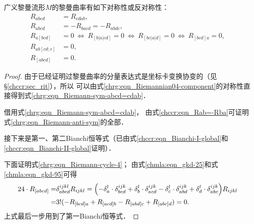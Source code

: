 \begin{theorem}\label{chrg:thm_Riemann-Sym-Properties}
广义黎曼流形$M$的黎曼曲率有如下对称性或反对称性：
\begin{align}
    R_{abcd} &= R_{cdab}, \label{chrg:eqn_Riemann-sym-abcd=cdab} \\
    R_{abcd} &= -R_{bacd} = -R_{abdc}, \label{chrg:eqn_Riemann-anti-sym}\\
    R_{a[bcd]} &= 0 \ \Leftrightarrow \ R_{[b|a|cd]} = 0
       \ \Leftrightarrow \ R_{[bc|a|d]} = 0 \ \Leftrightarrow \ R_{[bcd]a} = 0, \\
    R_{ab[cd;e]} &= 0, \\
    R_{[abcd]} &= 0 \label{chrg:eqn_Riemann-cycle-4}.
\end{align}
\end{theorem}
\begin{proof}
    由于已经证明过黎曼曲率的分量表达式是坐标卡变换协变的（见\S \ref{chccr:sec_rit}），所以
    可以由式\eqref{chrg:eqn_Riemannian04-component}的对称性直接得到式\eqref{chrg:eqn_Riemann-sym-abcd=cdab}．

    借用式\eqref{chrg:eqn_Riemann-sym-abcd=cdab}，
    由式\eqref{chccr:eqn_Rab=-Rba}可证明式\eqref{chrg:eqn_Riemann-anti-sym}的全部．

    接下来是第一、第二Bianchi恒等式（已由式\eqref{chccr:eqn_Bianchi-I-global}和\eqref{chccr:eqn_Bianchi-II-global}证明）．

    下面证明式\eqref{chrg:eqn_Riemann-cycle-4}；
    由式\eqref{chmla:eqn_gkd-25}和式\eqref{chmla:eqn_gkd-95}可得
    \begin{align*}
        24 \cdot R_{[abcd]}  =& \delta_{abcd}^{ijkl} R_{ijkl}
        =\Bigl(-\delta_{a}^{l} \cdot \delta_{bcd}^{ijk} +\delta_{b}^{l} \cdot \delta_{acd}^{ijk}
         -\delta_{c}^{l} \cdot \delta_{abd}^{ijk}  +\delta_{d}^{l} \cdot \delta_{abc}^{ijk} \Bigr)R_{ijkl} \\
        =& 3! ( -R_{[bcd]a} + R_{[acd]b} - R_{[abd]c} + R_{[abc]d} )=0 .
    \end{align*}
    上式最后一步用到了第一Bianchi恒等式．
\end{proof}

